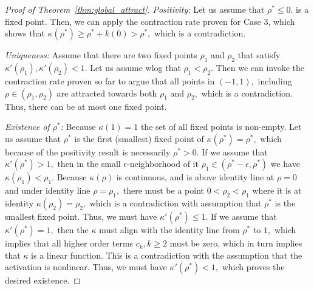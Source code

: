 \documentclass[twoside]{article}
\theoremstyle{definition}
\begin{document}
\begin{proof}[Proof of Theorem~\ref{thm:global_attract}]
\textit{Positivity:} Let us assume that $\rho^* \le 0.$ is a fixed point. Then, we can apply the contraction rate proven for Case 3, which shows that $\kappa(\rho^*)\ge \rho^* + k(0) > \rho^*,$ which is a contradiction.


\textit{Uniqueness:} Assume that there are two fixed points $\rho_1$ and $\rho_2$ that satisfy $\kappa'(\rho_1),\kappa'(\rho_2)<1.$ Let us assume wlog that $\rho_1 < \rho_2.$ Then we can invoke the contraction rate proven so far to argue that all points in $(-1,1),$ including  $\rho\in (\rho_1,\rho_2)$ are attracted towards both $\rho_1$ and $\rho_2,$ which is a contradiction. Thus, there can be at most one fixed point.

\textit{Existence of $\rho^*$:} Because $\kappa(1)=1$ the set of all fixed points is non-empty. Let us assume that $\rho^*$ is the first (smallest) fixed point of $\kappa(\rho^*) = \rho^*,$ which because of the positivity result is necessarily $\rho^*>0.$ If we assume that $\kappa'(\rho^*) > 1,$ then in the small $\epsilon$-neighborhood of it $\rho_1 \in(\rho^*-\epsilon,\rho^*)$ we have $\kappa(\rho_1) < \rho_1.$ Because $\kappa(\rho)$ is continuous, and is above identity line at $\rho=0$ and under identity line $\rho=\rho_1,$ there must be a point $0 < \rho_2 < \rho_1$ where it is at identity $\kappa(\rho_2) = \rho_2,$ which is a contradiction with assumption that $\rho^*$ is the smallest fixed point. Thus, we must have $\kappa'(\rho^*) \le 1.$ If we assume that $\kappa'(\rho^*) = 1,$ then the $\kappa$ must align with the identity line from $\rho^*$ to $1,$ which implies that all higher order terms $c_k,k\ge 2$ must be zero, which in turn implies that $\kappa$ is a linear function. This is a contradiction with the assumption that the activation is nonlinear. Thus, we must have $\kappa'(\rho^*) < 1,$ which proves the desired existence. 
\end{proof}
\end{document}
